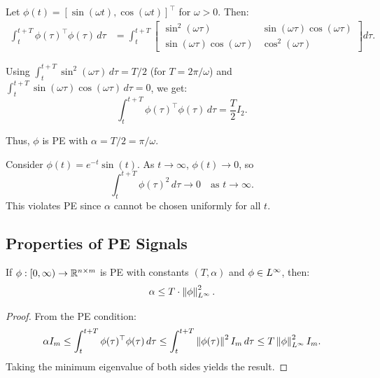 \begin{example}
Let $\phi(t) = [\sin(\omega t), \cos(\omega t)]^\top$ for $\omega > 0$. Then:
\begin{align}
    \int_t^{t+T} \phi(\tau)^\top \phi(\tau) \, d\tau &= \int_t^{t+T} \begin{bmatrix} \sin^2(\omega \tau) & \sin(\omega \tau)\cos(\omega \tau) \\ \sin(\omega \tau)\cos(\omega \tau) & \cos^2(\omega \tau) \end{bmatrix} d\tau.
\end{align}

Using $\int_t^{t+T} \sin^2(\omega \tau) \, d\tau = T/2$ (for $T = 2\pi/\omega$) and $\int_t^{t+T} \sin(\omega \tau)\cos(\omega \tau) \, d\tau = 0$, we get:
\begin{equation}
    \int_t^{t+T} \phi(\tau)^\top \phi(\tau) \, d\tau = \frac{T}{2} I_2.
\end{equation}

Thus, $\phi$ is PE with $\alpha = T/2 = \pi/\omega$.
\end{example}

\begin{example}
Consider $\phi(t) = e^{-t} \sin(t)$. As $t \to \infty$, $\phi(t) \to 0$, so
\begin{equation}
    \int_t^{t+T} \phi(\tau)^2 \, d\tau \to 0 \quad \text{as } t \to \infty.
\end{equation}
This violates PE since $\alpha$ cannot be chosen uniformly for all $t$.
\end{example}

\subsection{Properties of PE Signals}

\begin{lemma}
If $\phi: [0,\infty) \to \mathbb{R}^{n \times m}$ is PE with constants $(T, \alpha)$ and $\phi \in L^{\infty}$, then:
\begin{equation}
    \alpha \leq T \cdot \left\| \phi \right\|_{L^{\infty}}^2.
\end{equation}
\end{lemma}

\begin{proof}
From the PE condition:
\begin{equation}
    \alpha I_m \leq \int_t^{t+T} \phi(\tau)^\top \phi(\tau) \, d\tau \leq \int_t^{t+T} \left\| \phi(\tau) \right\|^2 I_m \, d\tau \leq T \left\| \phi \right\|_{L^{\infty}}^2 I_m.
\end{equation}
Taking the minimum eigenvalue of both sides yields the result.
\end{proof}

